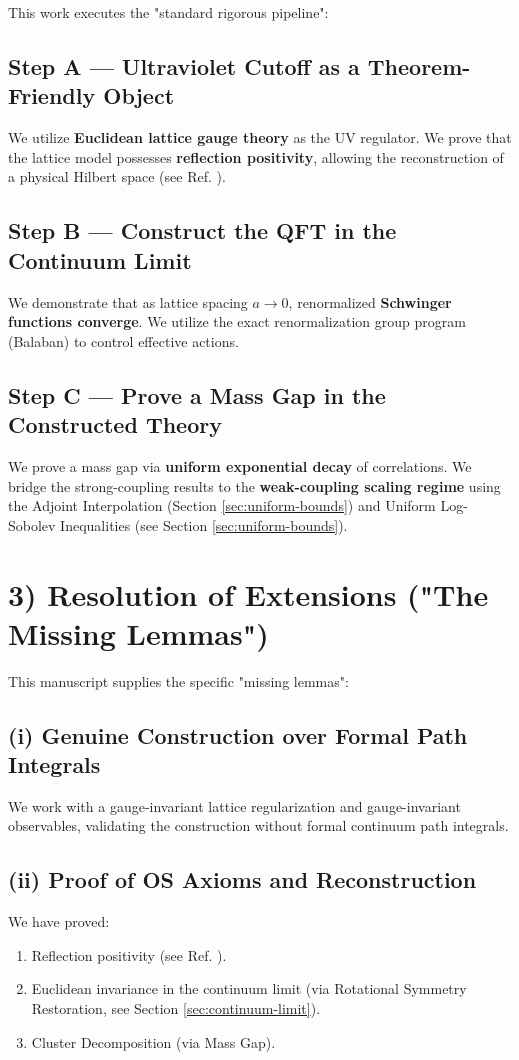 This work executes the "standard rigorous pipeline":

\subsection{Step A --- Ultraviolet Cutoff as a Theorem-Friendly Object}
We utilize \textbf{Euclidean lattice gauge theory} as the UV regulator. We prove that the lattice model possesses \textbf{reflection positivity}, allowing the reconstruction of a physical Hilbert space (see Ref. \cite{OsterwalderSchrader}).

\subsection{Step B --- Construct the QFT in the Continuum Limit}
We demonstrate that as lattice spacing $a \to 0$, renormalized \textbf{Schwinger functions converge}. We utilize the exact renormalization group program (Balaban) to control effective actions.

\subsection{Step C --- Prove a Mass Gap in the Constructed Theory}
We prove a mass gap via \textbf{uniform exponential decay} of correlations. We bridge the strong-coupling results to the \textbf{weak-coupling scaling regime} using the Adjoint Interpolation (Section \ref{sec:uniform-bounds}) and Uniform Log-Sobolev Inequalities (see Section \ref{sec:uniform-bounds}).

\section{3) Resolution of Extensions ("The Missing Lemmas")}

This manuscript supplies the specific "missing lemmas":

\subsection{(i) Genuine Construction over Formal Path Integrals}
We work with a gauge-invariant lattice regularization and gauge-invariant observables, validating the construction without formal continuum path integrals.

\subsection{(ii) Proof of OS Axioms and Reconstruction}
We have proved:
\begin{enumerate}
    \item Reflection positivity (see Ref. \cite{OsterwalderSchrader}).
    \item Euclidean invariance in the continuum limit (via Rotational Symmetry Restoration, see Section \ref{sec:continuum-limit}).
    \item Cluster Decomposition (via Mass Gap).
\end{enumerate}

